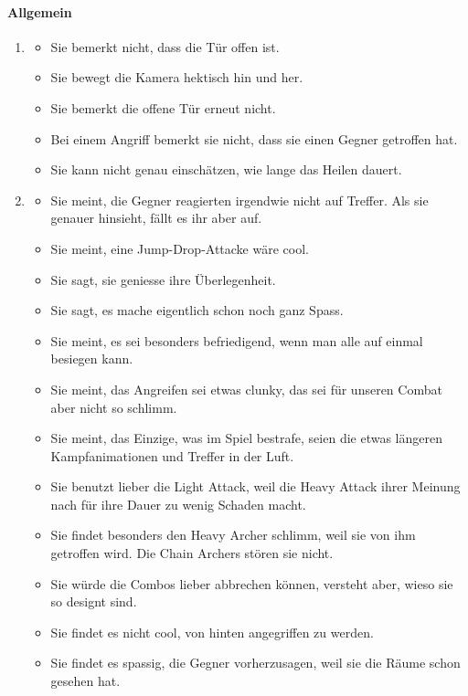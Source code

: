 \documentclass[../Main.tex]{subfiles}
\begin{document}
\paragraph{Allgemein}
\begin{enumerate}[label=\textbf{B\arabic*}, leftmargin=1.5cm, itemsep=0.8em, resume]
\item
\begin{itemize}[nosep]
\item Sie bemerkt nicht, dass die Tür offen ist.
\item Sie bewegt die Kamera hektisch hin und her.
\item Sie bemerkt die offene Tür erneut nicht.
\item Bei einem Angriff bemerkt sie nicht, dass sie einen Gegner getroffen hat.
\item Sie kann nicht genau einschätzen, wie lange das Heilen dauert.
\end{itemize}
\item
\begin{itemize}[nosep]
\item Sie meint, die Gegner reagierten irgendwie nicht auf Treffer. Als sie genauer hinsieht, fällt es ihr aber auf.
\item Sie meint, eine Jump-Drop-Attacke wäre cool.
\item Sie sagt, sie geniesse ihre Überlegenheit.
\item Sie sagt, es mache eigentlich schon noch ganz Spass.
\item Sie meint, es sei besonders befriedigend, wenn man alle auf einmal besiegen kann.
\item Sie meint, das Angreifen sei etwas clunky, das sei für unseren Combat aber nicht so schlimm.
\item Sie meint, das Einzige, was im Spiel bestrafe, seien die etwas längeren Kampfanimationen und Treffer in der Luft.
\item Sie benutzt lieber die Light Attack, weil die Heavy Attack ihrer Meinung nach für ihre Dauer zu wenig Schaden macht.
\item Sie findet besonders den Heavy Archer schlimm, weil sie von ihm getroffen wird. Die Chain Archers stören sie nicht.
\item Sie würde die Combos lieber abbrechen können, versteht aber, wieso sie so designt sind.
\item Sie findet es nicht cool, von hinten angegriffen zu werden.
\item Sie findet es spassig, die Gegner vorherzusagen, weil sie die Räume schon gesehen hat.

\end{itemize}
\end{enumerate}
\end{document}
